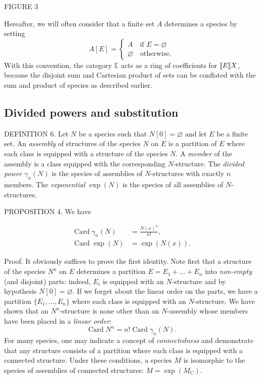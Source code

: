\documentclass{article}
\theoremstyle{definition}
\theoremstyle{remark}
\newcommand{\E}{\mathbb{E}}
\DeclareMathOperator{\Card}{Card}
\newcommand{\term}[1]{\emph{#1}}
\begin{document}
FIGURE 3

Hereafter, we will often consider that a finite set $A$
determines a species by setting
\[ A [E] = \begin{cases} A \quad \text{if $E = \varnothing$} \\ \varnothing \quad \text{otherwise}. \end{cases} \]
With this convention, the category $\E$ acts as a ring of coefficients
for $\Poly \E X$, because the disjoint sum and Cartesian product of sets
can be conflated with the sum and product of species as described
earlier.

\subsection{Divided powers and substitution}

DEFINITION 6. Let $N$ be a species such that $N [0] = \varnothing$ and let $E$ be a
finite set. An \term{assembly} of structures of the species $N$ on $E$ is a partition
of $E$ where each class is equipped with a structure of the species $N$.
A \term{member} of the assembly is a class equipped with the corresponding $N$-structure. The
\term{divided power} $\gamma_n(N)$ is the species of assemblies of $N$-structures with
exactly $n$ members. The \term{exponential} $\exp (N)$ is the species of all
assemblies of $N$-structures.

PROPOSITION 4. We have

\begin{align*}
\Card \gamma_n(N) &= \frac{N(x)^n}{n!}, \\
\Card \exp (N) &= \exp (N (x)).
\end{align*}

Proof. It obviously suffices to prove the first identity.  Note first
that a structure of the species $N^n$ on $E$ determines a partition $E
= E_1 + \dots + E_n$ into \emph{non-empty} (and disjoint) parts:
indeed, $E_i$ is equipped with an $N$-structure and by hypothesis $N
[0] = \varnothing$. If we forget about the linear order on the parts,
we have a partition $\{E_1, \dots, E_n\}$ where each class is equipped
with an $N$-structure. We have shown that an $N^n$-structure is none
other than an $N$-assembly whose members have been placed in a
\emph{linear order}:
\[ \Card N^n = n! \Card \gamma_n(N). \]
For many species, one may indicate a concept of \term{connectedness}
and demonstrate that any structure consists of a partition
where each class is equipped with a connected structure. Under these conditions, a
species $M$ is isomorphic to the species of assemblies of connected structures:
$M = \exp (M_C)$.
\end{document}
